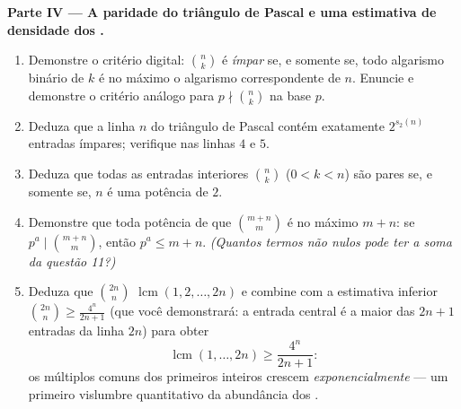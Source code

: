 \begin{problem}
\medskip
\noindent\textbf{Parte IV --- A paridade do triângulo de Pascal e
uma estimativa de densidade dos .}
\begin{enumerate}
  \item Demonstre o critério digital: $\binom nk$ é \emph{ímpar} se,
        e somente se, todo algarismo binário de $k$ é no máximo o
        algarismo correspondente de $n$. Enuncie e demonstre o
        critério análogo para $p \nmid \binom nk$ na base $p$.
  \item Deduza que a linha $n$ do triângulo de Pascal contém exatamente
        $2^{s_2(n)}$ entradas ímpares; verifique nas linhas $4$ e $5$.
  \item Deduza que todas as entradas interiores $\binom nk$ ($0 < k < n$)
        são pares se, e somente se, $n$ é uma potência de $2$.
  \item Demonstre que toda potência de  que  $\binom{m+n}m$ é no
        máximo $m + n$: se $p^a \mid \binom{m+n}m$, então $p^a \leq
        m + n$. \emph{(Quantos termos não nulos pode ter a soma da
        questão 11?)}
  \item Deduza que $\binom{2n}n$ 
        $\operatorname{lcm}(1, 2, \dots, 2n)$ e combine com
        a estimativa inferior $\binom{2n}n \geq \frac{4^n}{2n+1}$
        (que você demonstrará: a entrada central é a maior
        das $2n + 1$ entradas da linha $2n$) para obter
        \[
        \operatorname{lcm}(1, \dots, 2n) \geq \frac{4^n}{2n+1} :
        \]
        os múltiplos comuns dos primeiros inteiros crescem
        \emph{exponencialmente} --- um primeiro vislumbre quantitativo
        da abundância dos .
\end{enumerate}


\end{problem}
